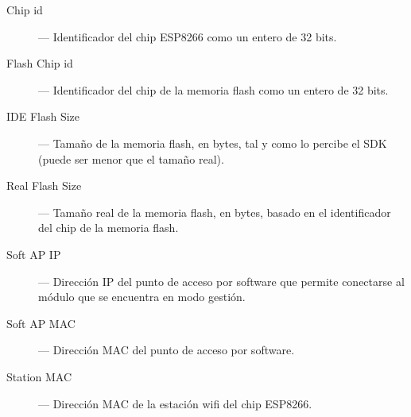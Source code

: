 \begin{description}

  \item[Chip id] --- Identificador del chip ESP8266 como un entero de 32 bits.

  \item[Flash Chip id] --- Identificador del chip de la memoria flash como un entero de 32 bits.
   
  \item[IDE Flash Size] --- Tamaño de la memoria flash, en bytes, tal y como lo percibe el SDK (puede ser menor que el tamaño real).
   
  \item[Real Flash Size] --- Tamaño real de la memoria flash, en bytes, basado en el identificador del chip de la memoria flash.
  
  \item[Soft AP IP] --- Dirección IP del punto de acceso por software que permite conectarse al módulo que se encuentra en modo gestión.
   
  \item[Soft AP MAC] --- Dirección MAC del punto de acceso por software.
   
  \item[Station MAC] --- Dirección MAC de la estación wifi del chip ESP8266.
   
\end{description}

\vfill

